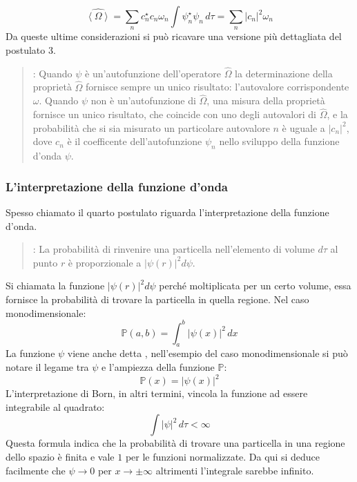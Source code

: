 $$\hat{\left \langle \Omega \right \rangle} = \sum_{n} c_n^{\star} c_n \omega_n \int \psi_n^{\star} \psi_n \, d\tau = \sum_n {\left| c_n \right|}^2 \omega_n$$
Da queste ultime considerazioni si può ricavare una versione più dettagliata del postulato 3.
\begin{quote}
  \textbf{}: Quando $\psi$ è un'autofunzione dell'operatore $\hat{\Omega}$ la determinazione della proprietà $\hat{\Omega}$ fornisce sempre un unico risultato: l'autovalore corrispondente $\omega$. Quando $\psi$ non è un'autofunzione di $\hat{\Omega}$, una misura della proprietà fornisce un unico risultato, che coincide con uno degli autovalori di $\hat{\Omega}$, e la probabilità che si sia misurato un particolare autovalore $n$ è uguale a ${\left|c_n\right|}^2$, dove $c_n$ è il coefficente dell'autofunzione $\psi_n$ nello sviluppo della funzione d'onda $\psi$.
\end{quote}

\subsubsection{L'interpretazione della funzione d'onda}
Spesso chiamato \textbf{} il quarto postulato riguarda l'interpretazione della funzione d'onda.
\begin{quote}
  \textbf{}: La probabilità di rinvenire una particella nell'elemento di volume $d\tau$ al punto $r$ è proporzionale a ${\left|\psi(r)\right|}^2 d\psi$.
\end{quote}
Si chiamata \textbf{} la funzione ${\left|\psi(r)\right|}^2 d\psi$ perché moltiplicata per un certo volume, essa fornisce la probabilità di trovare la particella in quella regione. Nel caso monodimensionale:
$$\mathbb{P}(a, b) = \int_a^b {\left|\psi(x)\right|}^2 \, dx$$
La funzione $\psi$ viene anche detta \textbf{}, nell'esempio del caso monodimensionale si può notare il legame tra $\psi$ e l'ampiezza della funzione $\mathbb{P}$:
$$\mathbb{P}(x) = {\left|\psi(x)\right|}^2$$
L'interpretazione di Born, in altri termini, vincola la funzione ad essere integrabile al quadrato:
$$\int {\left|\psi\right|}^2 \, d\tau < \infty$$
Questa formula indica che la probabilità di trovare una particella in una regione dello spazio è finita e vale $1$ per le funzioni normalizzate. Da qui si deduce facilmente che $\psi \to 0$ per $ x \to \pm \infty$ altrimenti l'integrale sarebbe infinito.

